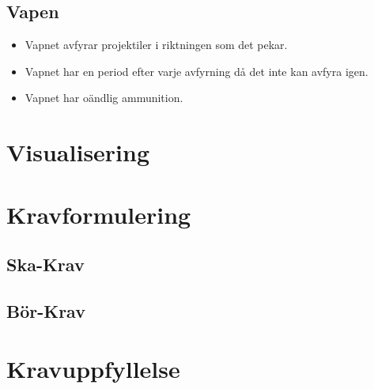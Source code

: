 \documentclass{TDP005mall}
\begin{document}
\subsection{Vapen}
\begin{itemize}
\item Vapnet avfyrar projektiler i riktningen som det pekar.
\item Vapnet har en period efter varje avfyrning då det inte kan avfyra igen.
\item Vapnet har oändlig ammunition.
\end{itemize}

\section{Visualisering}


\section{Kravformulering}

\subsection{Ska-Krav}

\subsection{Bör-Krav}

\section{Kravuppfyllelse}
\end{document}
